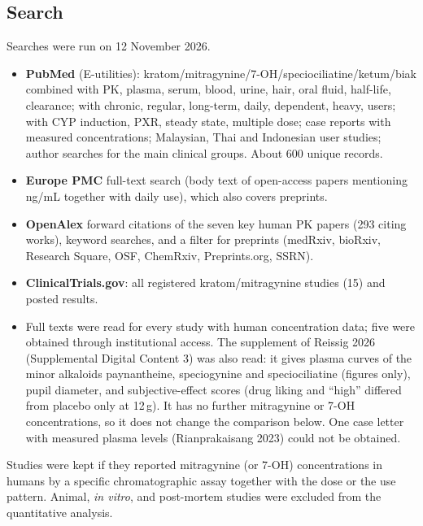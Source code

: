\documentclass[10pt,a4paper]{article}
\begin{document}
\subsection{Search}
Searches were run on 12 November 2026.
\begin{itemize}
\item \textbf{PubMed} (E-utilities): kratom/mitragynine/7-OH/speciociliatine/ketum/biak combined with PK, plasma, serum, blood,
urine, hair, oral fluid, half-life, clearance; with chronic, regular, long-term, daily, dependent, heavy, users; with CYP induction,
PXR, steady state, multiple dose; case reports with measured concentrations; Malaysian, Thai and Indonesian user studies; author
searches for the main clinical groups. About 600 unique records.
\item \textbf{Europe PMC} full-text search (body text of open-access papers mentioning ng/mL together with daily use), which also
covers preprints.
\item \textbf{OpenAlex} forward citations of the seven key human PK papers (293 citing works), keyword searches, and a filter for
preprints (medRxiv, bioRxiv, Research Square, OSF, ChemRxiv, Preprints.org, SSRN).
\item \textbf{ClinicalTrials.gov}: all registered kratom/mitragynine studies (15) and posted results.
\item Full texts were read for every study with human concentration data; five were obtained through institutional access.
The supplement of Reissig 2026~\cite{reissig2026} (Supplemental Digital Content 3) was also read: it gives plasma curves of the
minor alkaloids paynantheine, speciogynine and speciociliatine (figures only), pupil diameter, and subjective-effect scores
(drug liking and ``high'' differed from placebo only at 12\,g). It has no further mitragynine or 7-OH concentrations, so it does not
change the comparison below. One case letter with measured plasma levels (Rianprakaisang 2023) could not be obtained.
\end{itemize}
Studies were kept if they reported mitragynine (or 7-OH) concentrations in humans by a specific chromatographic assay together with
the dose or the use pattern. Animal, \emph{in vitro}, and post-mortem studies were excluded from the quantitative analysis.
\end{document}
